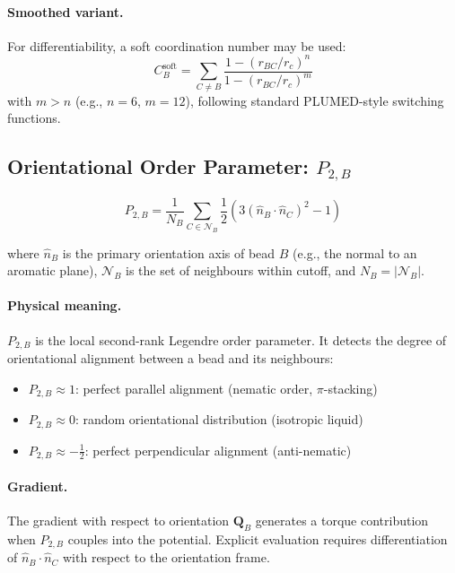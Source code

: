 \documentclass[11pt]{article}
\begin{document}
\paragraph{Smoothed variant.}
For differentiability, a soft coordination number may be used:
\begin{equation}
    C_B^{\mathrm{soft}} = \sum_{C \neq B}
    \frac{1 - (r_{BC}/r_c)^n}{1 - (r_{BC}/r_c)^m}
\end{equation}
with $m > n$ (e.g., $n = 6$, $m = 12$), following standard PLUMED-style
switching functions.

\subsection{Orientational Order Parameter: $P_{2,B}$}

\begin{equation}
    P_{2,B} = \frac{1}{N_B} \sum_{C \in \mathcal{N}_B}
    \frac{1}{2}\left(
        3\left(\hat{n}_B \cdot \hat{n}_C\right)^2 - 1
    \right)
\end{equation}

where $\hat{n}_B$ is the primary orientation axis of bead $B$ (e.g., the
normal to an aromatic plane), $\mathcal{N}_B$ is the set of neighbours
within cutoff, and $N_B = |\mathcal{N}_B|$.

\paragraph{Physical meaning.}
$P_{2,B}$ is the local second-rank Legendre order parameter.  It detects
the degree of orientational alignment between a bead and its neighbours:
\begin{itemize}
    \item $P_{2,B} \approx 1$: perfect parallel alignment (nematic order,
          $\pi$-stacking)
    \item $P_{2,B} \approx 0$: random orientational distribution (isotropic
          liquid)
    \item $P_{2,B} \approx -\tfrac{1}{2}$: perfect perpendicular alignment
          (anti-nematic)
\end{itemize}

\paragraph{Gradient.}
The gradient with respect to orientation $\mathbf{Q}_B$ generates a torque
contribution when $P_{2,B}$ couples into the potential.  Explicit evaluation
requires differentiation of $\hat{n}_B \cdot \hat{n}_C$ with respect to the
orientation frame.
\end{document}
